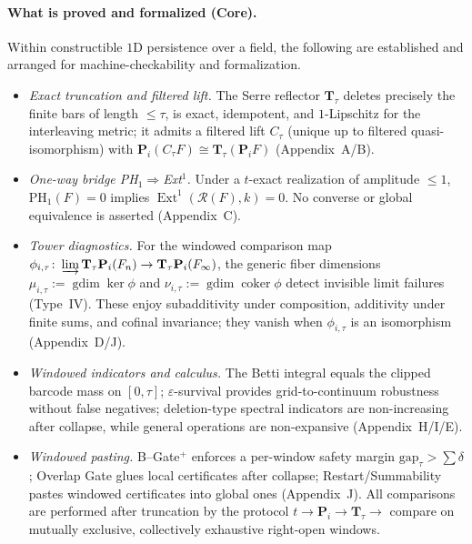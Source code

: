 \documentclass[11pt]{article}
\numberwithin{equation}{section}
\theoremstyle{plain}
\theoremstyle{definition}
\theoremstyle{remark}
\DeclareMathOperator{\gdim}{gdim}
\theoremstyle{plain}
\theoremstyle{definition}
\numberwithin{equation}{section}
\theoremstyle{definition}
\numberwithin{equation}{section}
\theoremstyle{plain}
\theoremstyle{definition}
\theoremstyle{remark}
\DeclareMathOperator{\coker}{coker} %
\begin{document}
\paragraph{What is proved and formalized (Core).}
Within constructible \(1\)D persistence over a field, the following are established and arranged for machine-checkability and formalization.
\begin{itemize}
  \item \emph{Exact truncation and filtered lift.} The Serre reflector \(\mathbf{T}_\tau\) deletes precisely the finite bars of length \(\le\tau\), is exact, idempotent, and \(1\)-Lipschitz for the interleaving metric; it admits a filtered lift \(C_\tau\) (unique up to filtered quasi-isomorphism) with \(\mathbf{P}_i(C_\tau F)\cong \mathbf{T}_\tau(\mathbf{P}_i F)\) (Appendix~A/B).
  \item \emph{One-way bridge PH\(_1\)\(\Rightarrow\)Ext\(^1\).} Under a \(t\)-exact realization of amplitude \(\le 1\), \(\mathrm{PH}_1(F)=0\) implies \(\operatorname{Ext}^1(\mathcal{R}(F),k)=0\). No converse or global equivalence is asserted (Appendix~C).
  \item \emph{Tower diagnostics.} For the windowed comparison map \(\phi_{i,\tau}\colon \varinjlim \mathbf{T}_\tau\mathbf{P}_i(F_n)\to \mathbf{T}_\tau\mathbf{P}_i(F_\infty)\), the generic fiber dimensions \(\mu_{i,\tau}:=\gdim\ker\phi\) and \(\nu_{i,\tau}:=\gdim\coker\phi\) detect invisible limit failures (Type~IV). These enjoy subadditivity under composition, additivity under finite sums, and cofinal invariance; they vanish when \(\phi_{i,\tau}\) is an isomorphism (Appendix~D/J).
  \item \emph{Windowed indicators and calculus.} The Betti integral equals the clipped barcode mass on \([0,\tau]\); \(\varepsilon\)-survival provides grid-to-continuum robustness without false negatives; deletion-type spectral indicators are non-increasing after collapse, while general operations are non-expansive (Appendix~H/I/E).
  \item \emph{Windowed pasting.} B--Gate\(^{+}\) enforces a per-window safety margin \(\mathrm{gap}_\tau>\sum\delta\); Overlap Gate glues local certificates after collapse; Restart/Summability pastes windowed certificates into global ones (Appendix~J). All comparisons are performed after truncation by the protocol \(t\to \mathbf{P}_i\to \mathbf{T}_\tau\to\) compare on mutually exclusive, collectively exhaustive right-open windows.
\end{itemize}
\end{document}
